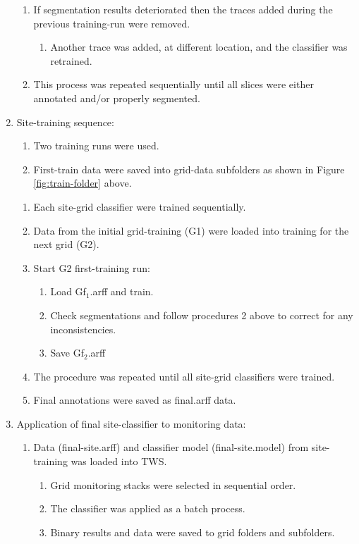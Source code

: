 \begin{enumerate}
\begin{enumerate}
	\item If segmentation results deteriorated then the traces added during the previous training-run were removed. 
			\begin{enumerate}
			\item Another trace was added, at different location, and the classifier was retrained.
			\end{enumerate}
	\item This process was repeated sequentially until all slices were either annotated and/or properly segmented.
	\end{enumerate}
\item Site-training sequence:
		\begin{enumerate}
			\item Two training runs were used. 
			\item First-train data were saved into grid-data subfolders as shown in Figure \ref{fig:train-folder} above.
		\end{enumerate}
		\begin{enumerate}
			\item Each site-grid classifier were trained sequentially.
			\item Data from the initial grid-training (G1) were loaded into training for the next grid (G2).
			\item Start G2 first-training run:
				\begin{enumerate}
				\item Load Gf$ _{1}$.arff and train.
				\item Check segmentations and follow procedures 2 above to correct for any inconsistencies.
				\item Save Gf$_{2}$.arff
				\end{enumerate}
			\item The procedure was repeated until all site-grid classifiers were trained.
			\item Final annotations were saved as final.arff data.
		\end{enumerate}
			\item Application of final site-classifier to monitoring data:
			\begin{enumerate}
			\item Data (final-site.arff) and classifier model (final-site.model) from site-training was loaded into \ac{TWS}.
				\begin{enumerate}
					\item Grid monitoring stacks were selected in sequential order.
					\item The classifier was applied as a batch process.
					\item Binary results and data were saved to grid folders and subfolders.
				\end{enumerate}
			\end{enumerate}
\end{enumerate}


